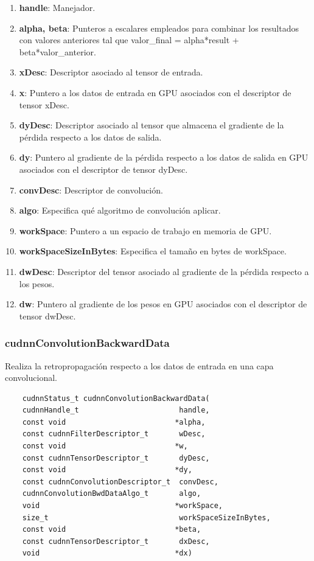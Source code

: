 \begin{enumerate}
	\item \textbf{handle}: Manejador.
	\item \textbf{alpha, beta}: Punteros a escalares empleados para combinar los resultados con valores anteriores tal que valor\_final = alpha*result + beta*valor\_anterior.
	\item \textbf{xDesc}: Descriptor asociado al tensor de entrada.
	\item \textbf{x}: Puntero a los datos de entrada en GPU asociados con el descriptor de tensor xDesc.	
	\item \textbf{dyDesc}: Descriptor asociado al tensor que almacena el gradiente de la pérdida respecto a los datos de salida.
	\item \textbf{dy}: Puntero al gradiente de la pérdida respecto a los datos de salida en GPU asociados con el descriptor de tensor dyDesc.
	\item \textbf{convDesc}: Descriptor de convolución.
	\item \textbf{algo}: Especifica qué algoritmo de convolución aplicar.
	\item \textbf{workSpace}: Puntero a un espacio de trabajo en memoria de GPU.
	\item \textbf{workSpaceSizeInBytes}: Especifica el tamaño en bytes de workSpace.
	\item \textbf{dwDesc}: Descriptor del tensor asociado al gradiente de la pérdida respecto a los pesos.
	\item \textbf{dw}: Puntero al gradiente de los pesos en GPU asociados con el descriptor de tensor dwDesc.
\end{enumerate}
\cite{cuDNN_conv_back_w}


\subsubsection{cudnnConvolutionBackwardData}
Realiza la retropropagación respecto a los datos de entrada en una capa convolucional.

\begin{verbatim}
	cudnnStatus_t cudnnConvolutionBackwardData(
	cudnnHandle_t                       handle,
	const void                         *alpha,
	const cudnnFilterDescriptor_t       wDesc,
	const void                         *w,
	const cudnnTensorDescriptor_t       dyDesc,
	const void                         *dy,
	const cudnnConvolutionDescriptor_t  convDesc,
	cudnnConvolutionBwdDataAlgo_t       algo,
	void                               *workSpace,
	size_t                              workSpaceSizeInBytes,
	const void                         *beta,
	const cudnnTensorDescriptor_t       dxDesc,
	void                               *dx)
\end{verbatim}

